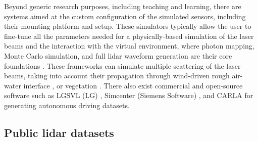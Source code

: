 Beyond generic research purposes, including teaching and learning, there are systems aimed at the custom configuration of the simulated sensors, including their mounting platform and setup. These simulators typically allow the user to fine-tune all the parameters needed for a physically-based simulation of the laser beams and the interaction with the virtual environment, where photon mapping, Monte Carlo simulation, and full \acrshort{lidar} waveform generation are their core foundations \cite{yun_simulation_2019, chen_ole_2020, zohdi_rapid_2020}. These frameworks can simulate multiple scattering of the laser beams, taking into account their propagation through wind-driven rough air-water interface \cite{chen_ole_2020}, or vegetation \cite{yun_simulation_2019, westling_simtreels_2020}. There also exist commercial and open-source software such as LGSVL (LG) \cite{lg_electronics_rd_lab_lgsvl_2021}, Simcenter (Siemens Software) \cite{siemens_simcenter_2021}, and CARLA \cite{dosovitskiy_carla_2017} for generating autonomous driving datasets.

\subsection{Public \acrshort{lidar} datasets}

